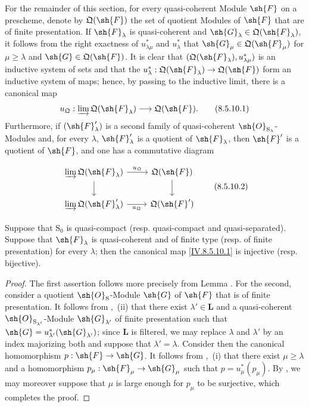 \begin{env}[8.5.10]
\label{IV.8.5.10}
For the remainder of this section, for every quasi-coherent Module $\sh{F}$ on a prescheme, denote by $\mathfrak{Q}(\sh{F})$ the set of quotient Modules of $\sh{F}$ that are of finite presentation. If $\sh{F}_\lambda$ is quasi-coherent and $\sh{G}_\lambda\in\mathfrak{Q}(\sh{F}_\lambda)$, it follows from the right exactness of $u_{\lambda\mu}^*$ and $u_\lambda^*$ that $\sh{G}_\mu\in\mathfrak{Q}(\sh{F}_\mu)$ for $\mu\geqslant\lambda$ and $\sh{G}\in\mathfrak{Q}(\sh{F})$. It is clear that $(\mathfrak{Q}(\sh{F}_\lambda),u_{\lambda\mu}^*)$ is an inductive system of sets and that the $u_\lambda^*:\mathfrak{Q}(\sh{F}_\lambda)\to\mathfrak{Q}(\sh{F})$ form an inductive system of maps; hence, by passing to the inductive limit, there is a canonical map
\[
u_{\mathfrak{Q}}:\varinjlim\mathfrak{Q}(\sh{F}_\lambda)\longrightarrow\mathfrak{Q}(\sh{F}).
\tag{8.5.10.1}\label{IV.8.5.10.1}
\]
Furthermore, if $(\sh{F}'_\lambda)$ is a second family of quasi-coherent $\sh{O}_{\mathrm{S}_\lambda}$-Modules and, for every $\lambda$, $\sh{F}'_\lambda$ is a quotient of $\sh{F}_\lambda$, then $\sh{F}'$ is a quotient of $\sh{F}$, and one has a commutative diagram


\[
\begin{tikzcd}
\varinjlim\mathfrak{Q}(\sh{F}_\lambda) \ar[r,"u_{\mathfrak{Q}}"] \ar[d] & \mathfrak{Q}(\sh{F}) \ar[d] \\
\varinjlim\mathfrak{Q}(\sh{F}'_\lambda) \ar[r,"u_{\mathfrak{Q}}"'] & \mathfrak{Q}(\sh{F}')
\end{tikzcd}
\tag{8.5.10.2}\label{IV.8.5.10.2}
\]
\end{env}

\begin{proposition}[8.5.11]
\label{IV.8.5.11}
Suppose that $\mathrm{S}_0$ is quasi-compact (resp. quasi-compact and quasi-separated). Suppose that $\sh{F}_\lambda$ is quasi-coherent and of finite type (resp. of finite presentation) for every $\lambda$; then the canonical map \eqref{IV.8.5.10.1} is injective (resp. bijective).
\end{proposition}

\begin{proof}
The first assertion follows more precisely from Lemma . For the second, consider a quotient $\sh{O}_{\mathrm{S}}$-Module $\sh{G}$ of $\sh{F}$ that is of finite presentation. It follows from ,~(ii) that there exist $\lambda'\in\mathbf{L}$ and a quasi-coherent $\sh{O}_{\mathrm{S}_{\lambda'}}$-Module $\sh{G}_{\lambda'}$ of finite presentation such that $\sh{G}=u_{\lambda'}^*(\sh{G}_{\lambda'})$; since $\mathbf{L}$ is filtered, we may replace $\lambda$ and $\lambda'$ by an index majorizing both and suppose that $\lambda'=\lambda$. Consider then the canonical homomorphism $p:\sh{F}\to\sh{G}$. It follows from ,~(i) that there exist $\mu\geqslant\lambda$ and a homomorphism $p_\mu:\sh{F}_\mu\to\sh{G}_\mu$ such that $p=u_\mu^*(p_\mu)$. By , we may moreover suppose that $\mu$ is large enough for $p_\mu$ to be surjective, which completes the proof.
\end{proof}

